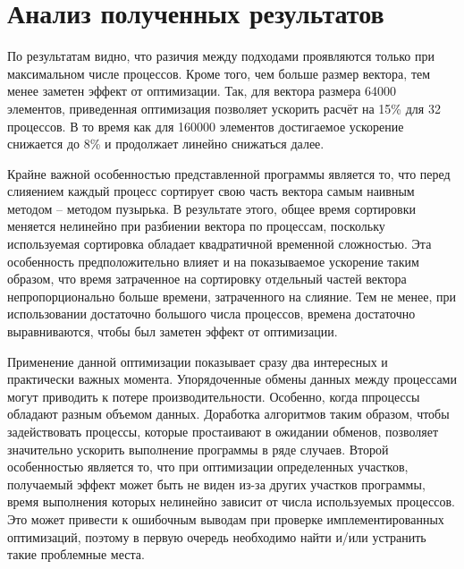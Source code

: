 \documentclass[12pt, oneside, a4paper]{article}
\begin{document}
\section{Анализ полученных результатов}

По результатам видно, что разичия между подходами проявляются только при максимальном числе процессов. Кроме того, чем больше размер вектора, тем менее заметен эффект от оптимизации. Так, для вектора размера 64000 элементов, приведенная оптимизация позволяет ускорить расчёт на 15\% для 32 процессов. В то время как для 160000 элементов достигаемое ускорение снижается до 8\% и продолжает линейно снижаться далее.

Крайне важной особенностью представленной программы является то, что перед слияением каждый процесс сортирует свою часть вектора самым наивным методом -- методом пузырька. В результате этого, общее время сортировки меняется нелинейно при разбиении вектора по процессам, поскольку используемая сортировка обладает квадратичной временной сложностью. Эта особенность предположительно влияет и на показываемое ускорение таким образом, что время затраченное на сортировку отдельный частей вектора непропорционально больше времени, затраченного на слияние. Тем не менее, при использовании достаточно большого числа процессов, времена достаточно выравниваются, чтобы был заметен эффект от оптимизации.

Применение данной оптимизации показывает сразу два интересных и практически важных момента. Упорядоченные обмены данных между процессами могут приводить к потере производительности. Особенно, когда ппроцессы обладают разным объемом данных. Доработка алгоритмов таким образом, чтобы задействовать процессы, которые простаивают в ожидании обменов, позволяет значительно ускорить выполнение программы в ряде случаев. Второй особенностью является то, что при оптимизации определенных участков, получаемый эффект может быть не виден из-за других участков программы, время выполнения которых нелинейно зависит от числа используемых процессов. Это может привести к ошибочным выводам при проверке имплементированных оптимизаций, поэтому в первую очередь необходимо найти и/или устранить такие проблемные места.
\end{document}
